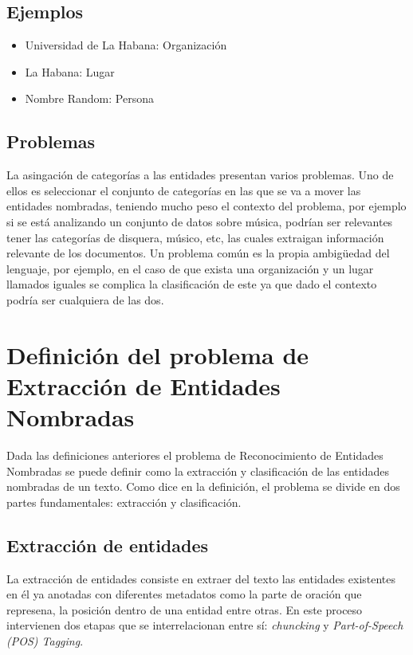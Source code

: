 \documentclass[runningheads]{llncs}
\begin{document}
\subsection{Ejemplos}

\begin{itemize}

\item Universidad de La Habana: Organización
\item La Habana: Lugar
\item Nombre Random: Persona %

\end{itemize}

\subsection{Problemas}

La asingación de categorías a las entidades presentan varios problemas. Uno de ellos es seleccionar el conjunto de categorías en las que se va a mover las entidades nombradas, teniendo mucho peso el contexto del problema, por ejemplo si se está analizando un conjunto de datos sobre música, podrían ser relevantes tener las categorías de disquera, músico, etc, las cuales extraigan información relevante de los documentos. Un problema común es la propia ambigüedad del lenguaje, por ejemplo, en el caso de que exista una organización y un lugar llamados iguales se complica la clasificación de este ya que dado el contexto podría ser cualquiera de las dos. %

\section{Definición del problema de Extracción de Entidades Nombradas}

Dada las definiciones anteriores el problema de Reconocimiento de Entidades Nombradas se puede definir como la extracción y clasificación de las entidades nombradas de un texto. Como dice en la definición, el problema se divide en dos partes fundamentales: extracción y clasificación.

\subsection{Extracción de entidades}

La extracción de entidades consiste en extraer del texto las entidades existentes en él ya anotadas con diferentes metadatos como la parte de oración que represena, la posición dentro de una entidad entre otras. En este proceso intervienen dos etapas que se interrelacionan entre sí: \emph{chuncking}\cite{chunking} y \emph{Part-of-Speech (POS) Tagging}\cite{postag}.
\end{document}
